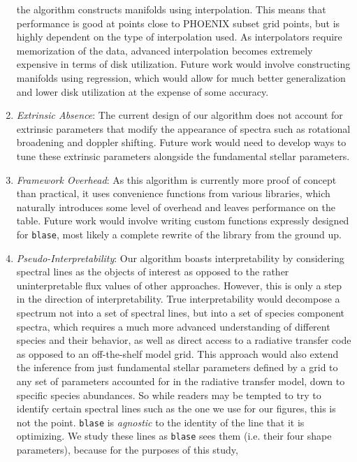 \documentclass[twocolumn]{aastex631}
\begin{document}
\begin{enumerate}[label=-]
    the algorithm constructs manifolds using interpolation. This means that
    performance is good at points close to PHOENIX subset grid points, but
    is highly dependent on the type of interpolation used. As interpolators
    require memorization of the data, advanced interpolation becomes extremely
    expensive in terms of disk utilization. Future work would involve 
    constructing manifolds using regression, which would allow for much
    better generalization and lower disk utilization at the expense of
    some accuracy.
    \item \textit{Extrinsic Absence}: The current design of our algorithm
    does not account for extrinsic parameters that modify the appearance of 
    spectra such as rotational broadening and doppler shifting. Future work
    would need to develop ways to tune these extrinsic parameters alongside
    the fundamental stellar parameters.
    \item \textit{Framework Overhead}: As this algorithm is currently more 
    proof of concept than practical, it uses convenience functions from 
    various libraries, which naturally introduces some level of overhead and 
    leaves performance on the table. Future work would involve writing 
    custom functions expressly designed for \texttt{blase}, most likely a 
    complete rewrite of the library from the ground up.
    \item \textit{Pseudo-Interpretability}: Our algorithm boasts interpretability
    by considering spectral lines as the objects of interest as opposed to 
    the rather uninterpretable flux values of other approaches. However, this
    is only a step in the direction of interpretability. True interpretability
    would decompose a spectrum not into a set of spectral lines, but into a
    set of species component spectra, which requires a much more advanced 
    understanding of different species and their behavior, as well as
    direct access to a radiative transfer code as opposed to an off-the-shelf
    model grid. This approach would also extend the inference from just
    fundamental stellar parameters defined by a grid to any set of parameters
    accounted for in the radiative transfer model, down to specific species
    abundances. So while readers may be tempted to try to identify certain 
    spectral lines such as the one we use for our figures, this is not 
    the point. \texttt{blase} is \textit{agnostic} to the identity of the line
    that it is optimizing. We study these lines as \texttt{blase} sees them
    (i.e. their four shape parameters), because for the purposes of this study, 

\end{enumerate}
\end{document}
